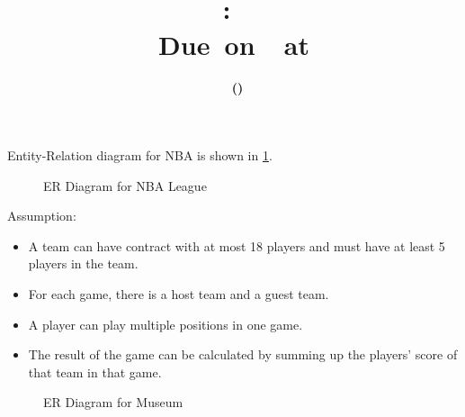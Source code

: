 \documentclass[12pt,letterpaper,titlepage,en-US]{article}
\title{
    \vspace{2in}
    \textmd{\textbf{\hmwkClassName \\\hmwkClass:\ \hmwkTitle}}\\
    \normalsize\vspace{0.1in}\small{Due\ on\ \DTMusedate{DueDate}\ at \DTMusetime{DueDate} }\\
    \vspace{0.1in}\large{\textit{\hmwkClassInstructor}}
    \vspace{3in}
}
\author{\textbf{\hmwkAuthorName\ \footnotesize{(\hmwkAuthorNetID)}} \\ \hmwkAuthorUTDEmail}
\date{}
\begin{document}
\maketitle


\pagebreak

\begin{homeworkProblem}
Entity-Relation diagram for NBA is shown in \cref{fig:tikz:nba}.

\begin{figure}[!htb]
  \caption{ER Diagram for NBA League}
  \label{fig:tikz:nba}
\end{figure}

Assumption:

\begin{itemize}
    \item A team can have contract with at most 18 players and must have at least 5 players in the team.
    \item For each game, there is a host team and a guest team.
    \item A player can play multiple positions in one game.
    \item The result of the game can be calculated by summing up the players' score of that team in that game.
\end{itemize}

\end{homeworkProblem}

\pagebreak

\begin{homeworkProblem}

\begin{figure}[!htb]
  \caption{ER Diagram for Museum}
  \label{fig:tikz:museum}
\end{figure}

\end{homeworkProblem}
\end{document}

